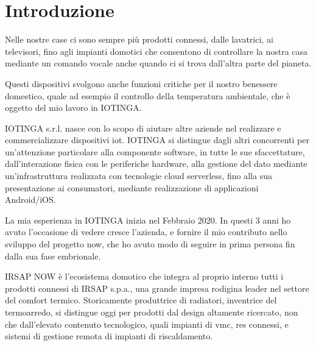 \documentclass[12pt,a4paper,twoside,titlepage]{book}
\begin{document}
\frontmatter

\begin{frontespizio}
\end{frontespizio}

\tableofcontents

\mainmatter


\chapter{Introduzione}

Nelle nostre case ci sono sempre più prodotti connessi,
dalle lavatrici, ai televisori, fino agli impianti domotici che
consentono di controllare la nostra casa mediante un comando vocale
anche quando ci si trova dall'altra parte del pianeta.

Questi dispositivi svolgono anche funzioni critiche per il nostro
benessere domestico, quale ad esempio il controllo della temperatura
ambientale, che è oggetto del mio lavoro in IOTINGA.

IOTINGA s.r.l. nasce con lo scopo di aiutare altre aziende nel realizzare e
commercializzare dispositivi \Gls{iot}. IOTINGA si distingue dagli altri
concorrenti per un'attenzione particolare alla componente software,
in tutte le sue sfaccettature, dall'interazione fisica con le periferiche
hardware, alla gestione del dato mediante un'infrastruttura realizzata
con tecnologie \gls{cloud} \gls{serverless}, fino alla sua presentazione ai consumatori,
mediante realizzazione di applicazioni Android/iOS.

La mia esperienza in IOTINGA inizia nel Febbraio 2020. In questi 3 anni
ho avuto l'occasione di vedere cresce l'azienda, e fornire il mio contributo
nello sviluppo del progetto \Gls{now}, che ho avuto modo di seguire
in prima persona fin dalla sua fase embrionale.

IRSAP NOW è l'ecosistema domotico che integra al proprio interno tutti
i prodotti connessi di IRSAP s.p.a., una grande impresa rodigina leader
nel settore del comfort termico. Storicamente produttrice di radiatori,
inventrice del termoarredo, si distingue oggi per prodotti dal design altamente
ricercato, non che dall'elevato contenuto tecnologico, quali impianti di \Gls{vmc},
\glspl{re} connessi, e sistemi di gestione remota di impianti di riscaldamento.
\end{document}
